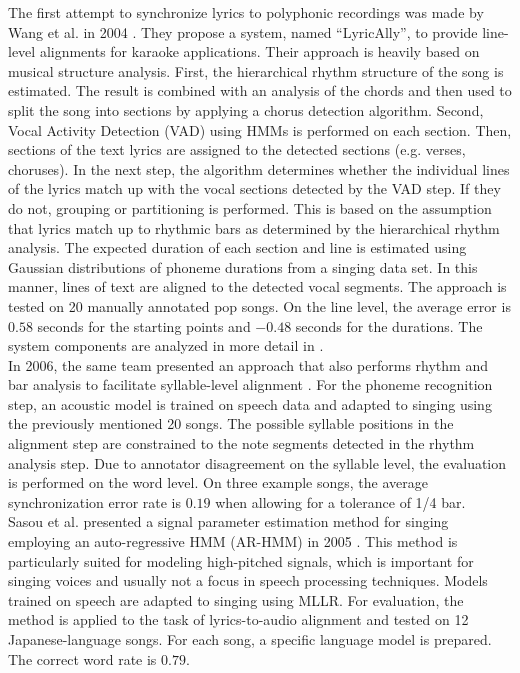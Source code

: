 The first attempt to synchronize lyrics to polyphonic recordings was made by Wang et al. in 2004 \cite{Wang2004}. They propose a system, named ``LyricAlly'', to provide line-level alignments for karaoke applications. Their approach is heavily based on musical structure analysis. First, the hierarchical rhythm structure of the song is estimated. The result is combined with an analysis of the chords and then used to split the song into sections by applying a chorus detection algorithm. Second, Vocal Activity Detection (VAD) using HMMs is performed on each section. Then, sections of the text lyrics are assigned to the detected sections (e.g. verses, choruses). In the next step, the algorithm determines whether the individual lines of the lyrics match up with the vocal sections detected by the VAD step. If they do not, grouping or partitioning is performed. This is based on the assumption that lyrics match up to rhythmic bars as determined by the hierarchical rhythm analysis. The expected duration of each section and line is estimated using Gaussian distributions of phoneme durations from a singing data set. In this manner, lines of text are aligned to the detected vocal segments. The approach is tested on 20 manually annotated pop songs. On the line level, the average error is $0.58$ seconds for the starting points and $-0.48$ seconds for the durations. The system components are analyzed in more detail in \cite{lyrically}.\\
In 2006, the same team presented an approach that also performs rhythm and bar analysis to facilitate syllable-level alignment \cite{Iskandar:2006}. For the phoneme recognition step, an acoustic model is trained on speech data and adapted to singing using the previously mentioned 20 songs. The possible syllable positions in the alignment step are constrained to the note segments detected in the rhythm analysis step. Due to annotator disagreement on the syllable level, the evaluation is performed on the word level. On three example songs, the average synchronization error rate is $0.19$ when allowing for a tolerance of 1/4 bar.\\  

Sasou et al. presented a signal parameter estimation method for singing employing an auto-regressive HMM (AR-HMM) in 2005 \cite{Sasou2005AnAN}. This method is particularly suited for modeling high-pitched signals, which is important for singing voices and usually not a focus in speech processing techniques. Models trained on speech are adapted to singing using MLLR. For evaluation, the method is applied to the task of lyrics-to-audio alignment and tested on 12 Japanese-language songs. For each song, a specific language model is prepared. The correct word rate is $0.79$.\\

